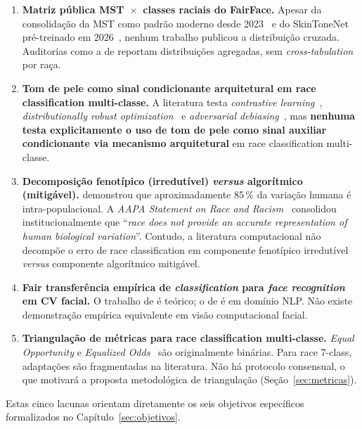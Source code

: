\begin{enumerate}[label=\textbf{G\arabic*}.]
\item \textbf{Matriz pública MST~$\times$~classes raciais do FairFace.} Apesar da consolidação da MST como padrão moderno desde 2023~\autocite{schumann2023consensus} e do SkinToneNet pré-treinado em 2026~\autocite{matias2026large}, nenhum trabalho publicou a distribuição cruzada. Auditorias como a de \textcite{matias2026large} reportam distribuições agregadas, sem \emph{cross-tabulation} por raça.

\item \textbf{Tom de pele como sinal condicionante arquitetural em race classification multi-classe.} A literatura testa \emph{contrastive learning}~\autocite{park2022fair}, \emph{distributionally robust optimization}~\autocite{sagawa2020distribution} e \emph{adversarial debiasing}~\autocite{zhang2018mitigating}, mas \textbf{nenhuma testa explicitamente o uso de tom de pele como sinal auxiliar condicionante via mecanismo arquitetural} em race classification multi-classe.

\item \textbf{Decomposição fenotípico (irredutível) \emph{versus} algorítmico (mitigável).} \textcite{lewontin1972apportionmen} demonstrou que aproximadamente 85\,\% da variação humana é intra-populacional. A \emph{AAPA Statement on Race and Racism}~\autocite{fuentes2019aapa} consolidou institucionalmente que ``\emph{race does not provide an accurate representation of human biological variation}''. Contudo, a literatura computacional não decompõe o erro de race classification em componente fenotípico irredutível \emph{versus} componente algorítmico mitigável.

\item \textbf{Fair transferência empírica de \emph{classification} para \emph{face recognition} em CV facial.} O trabalho de \textcite{madras2018learning} é teórico; o de \textcite{aguirre2023transferring} é em domínio NLP. Não existe demonstração empírica equivalente em visão computacional facial.

\item \textbf{Triangulação de métricas para race classification multi-classe.} \emph{Equal Opportunity} e \emph{Equalized Odds}~\autocite{hardt2016equality} são originalmente binárias. Para race 7-class, adaptações são fragmentadas na literatura. Não há protocolo consensual, o que motivará a proposta metodológica de triangulação (Seção~\ref{sec:metricas}).
\end{enumerate}

Estas cinco lacunas orientam diretamente os seis objetivos específicos formalizados no Capítulo~\ref{sec:objetivos}.
